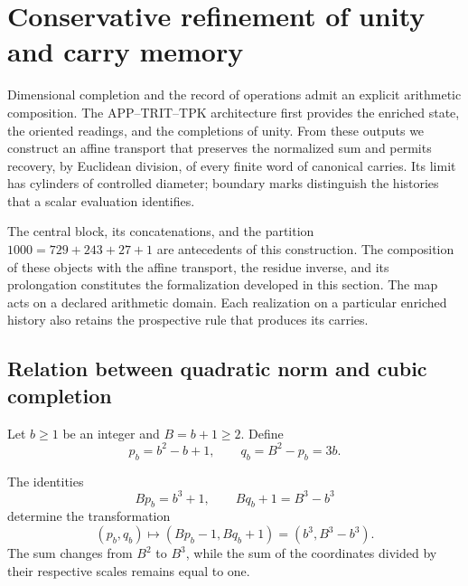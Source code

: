 \chapter{Conservative refinement of unity and carry memory}
\label{x_reciprocidad:lib03:refinamiento}

Dimensional completion and the record of operations admit an explicit
arithmetic composition. The APP--TRIT--TPK architecture first provides
the enriched state, the oriented readings, and the
completions of unity. From these outputs we construct an
affine transport that preserves the normalized sum and permits recovery, by
Euclidean division, of every finite word of canonical carries. Its limit
has cylinders of controlled diameter; boundary marks distinguish
the histories that a scalar evaluation identifies.

The central block, its concatenations, and the partition
\(1000=729+243+27+1\) are antecedents of this construction. The composition
of these objects with the affine transport, the residue inverse, and its
prolongation constitutes the formalization developed in this section.
The map acts on a declared arithmetic domain. Each realization
on a particular enriched history also retains the
prospective rule that produces its carries.

\section{Relation between quadratic norm and cubic completion}
\label{x_reciprocidad:lib03:completacion}

Let \(b\geq1\) be an integer and \(B=b+1\geq2\). Define
\begin{equation}
 p_b=b^2-b+1,\qquad q_b=B^2-p_b=3b.
 \label{x_reciprocidad:lib03:pb}
\end{equation}

\begin{proposition}
\label{x_reciprocidad:lib03:prop-completacion}
The identities
\begin{equation}
 Bp_b=b^3+1,\qquad Bq_b+1=B^3-b^3
 \label{x_reciprocidad:lib03:cuadratica-cubica}
\end{equation}
determine the transformation
\begin{equation}
 (p_b,q_b)\longmapsto(Bp_b-1,Bq_b+1)
       =(b^3,B^3-b^3).
 \label{x_reciprocidad:lib03:transferencia-cubica}
\end{equation}
The sum changes from \(B^2\) to \(B^3\), while the sum of the
coordinates divided by their respective scales remains equal to one.
\end{proposition}

